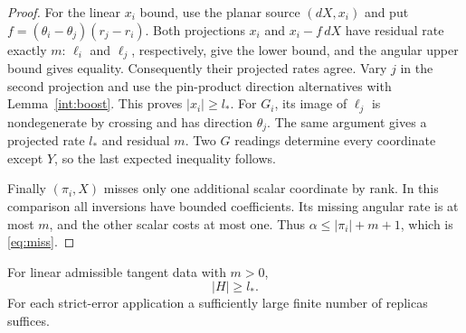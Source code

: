 \begin{proof}
For the linear $x_i$ bound, use the planar source
$(dX,x_i)$ and put
$f=(\theta_i-\theta_j)(r_j-r_i)$. Both projections
$x_i$ and $x_i-f\,dX$ have residual rate exactly $m$:
$\ell_i$ and $\ell_j$, respectively, give the lower
bound, and the angular upper bound gives equality.
Consequently their projected rates agree. Vary $j$ in
the second projection and use the pin-product direction
alternatives with Lemma~\ref{int:boost}. This proves
$|x_i|\geq l_*$. For $G_i$, its image of $\ell_j$ is
nondegenerate by crossing and has direction $\theta_j$.
The same argument gives a projected rate $l_*$ and
residual $m$. Two $G$ readings determine every coordinate
except $Y$, so the last expected inequality follows.

Finally $(\pi_i,X)$ misses only one additional scalar
coordinate by rank. In this comparison all inversions
have bounded coefficients. Its missing angular rate is
at most $m$, and the other scalar costs at most one.
Thus $\alpha\leq|\pi_i|+m+1$, which is
\eqref{eq:miss}.
\end{proof}

\begin{lemma}\label{int:many-leg}
For linear admissible tangent data with $m>0$,
\begin{equation}
 |H|\geq l_*.
 \tag{H-walk}\label{eq:H-walk}
\end{equation}
For each strict-error application a sufficiently large
finite number of replicas suffices.
\end{lemma}

